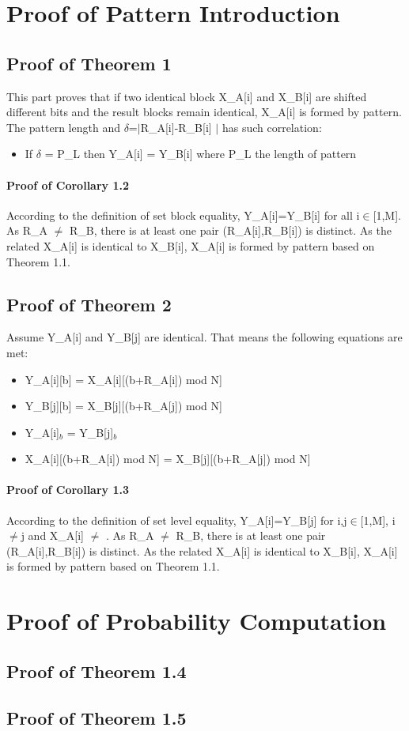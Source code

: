 \documentclass{article}
\begin{document}
\appendix
\section{Proof of Pattern Introduction}
\subsection{Proof of Theorem 1}
This part proves that if two identical block X\_A[i]  and X\_B[i] are shifted different bits and the result blocks remain identical, X\_A[i] is formed by pattern. The pattern length and $\delta$=$\mid$R\_A[i]-R\_B[i] $\mid$ has such correlation:
\begin{itemize}
	\item If $\delta$ = P\_L then Y\_A[i] = Y\_B[i] where P\_L the length of pattern
\end{itemize}
\paragraph{Proof of Corollary 1.2}
According to the definition of set block equality, Y\_A[i]=Y\_B[i] for all i$\in$[1,M]. As R\_A $\neq$ R\_B, there is at least one pair (R\_A[i],R\_B[i]) is distinct. As the related X\_A[i] is identical to X\_B[i], X\_A[i] is formed by pattern based on Theorem 1.1.

\subsection{Proof of Theorem 2}
Assume Y\_A[i] and Y\_B[j] are identical.  That means the following equations are met:
\begin{itemize}
	\item Y\_A[i][b] = X\_A[i][(b+R\_A[i]) mod N] 
	\item Y\_B[j][b] = X\_B[j][(b+R\_A[j]) mod N]
	\item Y\_A[i]$_b$ = Y\_B[j]$_b$  
	\item X\_A[i][(b+R\_A[i]) mod N] = X\_B[j][(b+R\_A[j]) mod N]    
\end{itemize} 


\paragraph{Proof of Corollary 1.3}
According to the definition of set level equality, Y\_A[i]=Y\_B[j] for i,j$\in$[1,M], i$\neq$j and X\_A[i] $\neq$ . As R\_A $\neq$ R\_B, there is at least one pair (R\_A[i],R\_B[i]) is distinct. As the related X\_A[i] is identical to X\_B[i], X\_A[i] is formed by pattern based on Theorem 1.1.
\section{Proof of Probability Computation}
\subsection{Proof of Theorem 1.4}
\subsection{Proof of Theorem 1.5}
\end{document}
